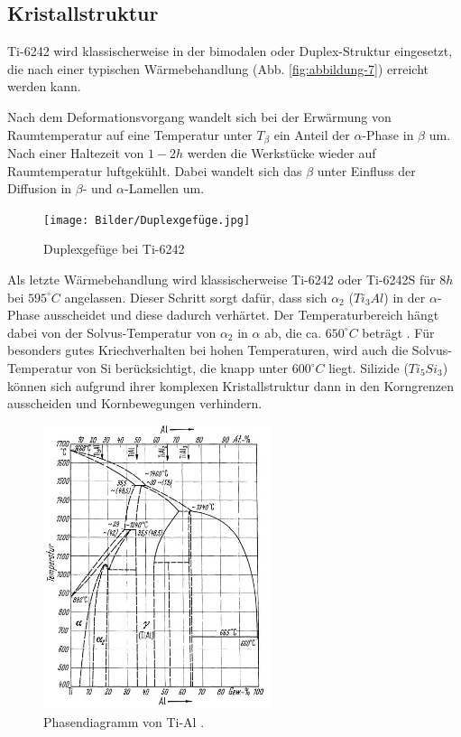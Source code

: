 
\subsection{Kristallstruktur}

Ti-6242 wird klassischerweise in der bimodalen oder Duplex-Struktur eingesetzt, die nach einer typischen Wärmebehandlung (Abb. \ref{fig:abbildung-7}) erreicht werden kann.

Nach dem Deformationsvorgang wandelt sich bei der Erwärmung von Raumtemperatur  auf eine Temperatur unter $T_{\beta}$  ein Anteil der $\alpha$-Phase in $\beta$ um. Nach einer Haltezeit von $1-2h$ werden die Werkstücke wieder auf Raumtemperatur luftgekühlt.
Dabei wandelt sich das $\beta$ unter Einfluss der Diffusion in $\beta$- und $\alpha$-Lamellen um.

\begin{figure}[H]
	\centering
	\texttt{[image: Bilder/Duplexgefüge.jpg]}
	\caption{Duplexgefüge bei Ti-6242}
	\label{fig:L.M}
\end{figure}


Als letzte Wärmebehandlung wird klassischerweise  Ti-6242 oder Ti-6242S für  $8 h$ bei $595^\circ C$ angelassen. Dieser Schritt sorgt dafür, dass sich $\alpha_2$ ($Ti_3Al$) in der $\alpha$-Phase ausscheidet und diese dadurch verhärtet. Der Temperaturbereich hängt dabei von der Solvus-Temperatur von $\alpha_2$ in $\alpha$ ab, die ca. $650^\circ C$ beträgt \cite{Lutjering.2007}.
Für besonders gutes Kriechverhalten bei hohen Temperaturen, wird auch die Solvus-Temperatur von Si berücksichtigt, die knapp unter $600^\circ C$ liegt. Silizide ($Ti_5Si_3$) können sich aufgrund ihrer komplexen Kristallstruktur dann in den Korngrenzen ausscheiden und Kornbewegungen verhindern.

\begin{figure}[H]
	\centering
	\includegraphics[width=0.6\textwidth]{Bilder/TiAl}
	\caption{Phasendiagramm von Ti-Al . \cite{Zwicker.2014}}
	\label{fig:PD_tial}
\end{figure}

